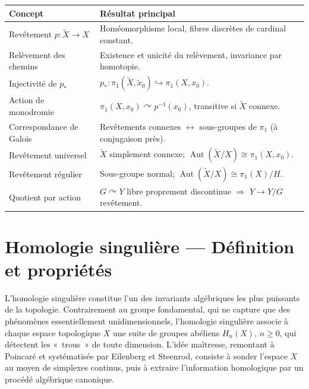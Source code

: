 \documentclass[12pt,a4paper,openany]{book}
\theoremstyle{definition}
\theoremstyle{plain}
\theoremstyle{remark}
\DeclareMathOperator{\Aut}{Aut}
\begin{document}
\begin{center}
\renewcommand{\arraystretch}{1.4}
\begin{tabular}{p{5cm} p{9cm}}
\toprule
\textbf{Concept} & \textbf{Résultat principal} \\
\midrule
Revêtement $p \colon \widetilde{X} \to X$ &
Homéomorphisme local, fibres discrètes de cardinal constant. \\
Relèvement des chemins &
Existence et unicité du relèvement, invariance par homotopie. \\
Injectivité de $p_*$ &
$p_* \colon \pi_1(\widetilde{X}, \tilde{x}_0) \hookrightarrow \pi_1(X, x_0)$. \\
Action de monodromie &
$\pi_1(X, x_0) \curvearrowright p^{-1}(x_0)$, transitive si $\widetilde{X}$ connexe. \\
Correspondance de Galois &
Revêtements connexes $\leftrightarrow$ sous-groupes de $\pi_1$ (à conjugaison près). \\
Revêtement universel &
$\widetilde{X}$ simplement connexe; $\Aut(\widetilde{X}/X) \cong \pi_1(X, x_0)$. \\
Revêtement régulier &
Sous-groupe normal; $\Aut(\widetilde{X}/X) \cong \pi_1(X)/H$. \\
Quotient par action &
$G \curvearrowright Y$ libre proprement discontinue $\Rightarrow$ $Y \to Y/G$ revêtement. \\
\bottomrule
\end{tabular}
\end{center}



\chapter{Homologie singulière --- Définition et propriétés}\label{chap:homologie-singuliere}
\minitoc\vspace{1cm}

\noindent
L'homologie singulière constitue l'un des invariants algébriques les plus puissants de la topologie.
Contrairement au groupe fondamental, qui ne capture que des phénomènes essentiellement unidimensionnels,
l'homologie singulière associe à chaque espace topologique $X$ une suite de groupes abéliens
$H_n(X)$, $n \geq 0$, qui détectent les «~trous~» de toute dimension.
L'idée maîtresse, remontant à Poincaré et systématisée par Eilenberg et Steenrod, consiste à
sonder l'espace $X$ au moyen de simplexes continus, puis à extraire l'information
homologique par un procédé algébrique canonique.
\end{document}
